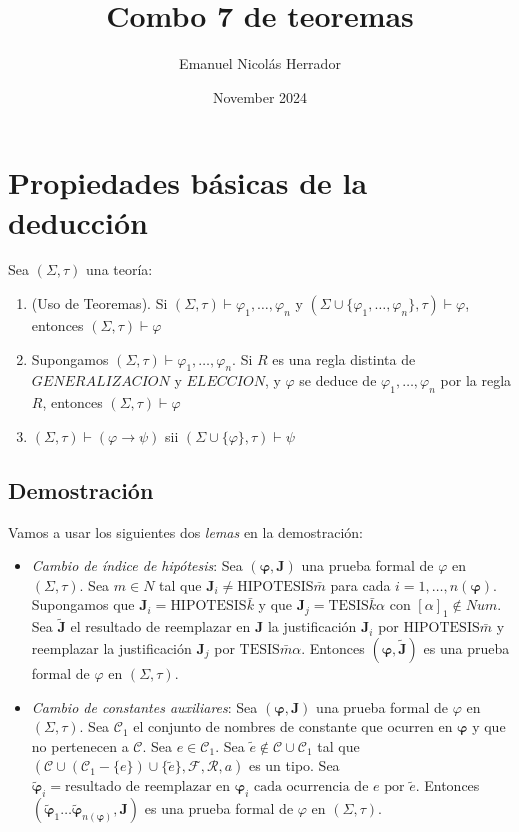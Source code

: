 \documentclass{article}
\title{Combo 7 de teoremas}
\author{Emanuel Nicolás Herrador}
\date{November 2024}
\begin{document}
\maketitle

\section*{Propiedades básicas de la deducción}
Sea $(\Sigma,\tau)$ una teoría:
\begin{enumerate}
  \item (Uso de Teoremas). Si $(\Sigma,\tau)\vdash\varphi_1,\dots,\varphi_n$ y $(\Sigma\cup\{\varphi_1,\dots,\varphi_n\},\tau)\vdash\varphi$, entonces $(\Sigma,\tau)\vdash\varphi$
  \item Supongamos $(\Sigma,\tau)\vdash\varphi_1,\dots,\varphi_n$. Si $R$ es una regla distinta de $GENERALIZACION$ y $ELECCION$, y $\varphi$ se deduce de $\varphi_1,\dots,\varphi_n$ por la regla $R$, entonces $(\Sigma,\tau)\vdash\varphi$
  \item $(\Sigma,\tau)\vdash(\varphi\to\psi)$ sii $(\Sigma\cup\{\varphi\},\tau)\vdash\psi$
\end{enumerate}
\subsection*{Demostración}
Vamos a usar los siguientes dos \textit{lemas} en la demostración:
\begin{itemize}
  \item \textit{Cambio de índice de hipótesis}: Sea $(\boldsymbol{\varphi},\mathbf{J})$ una prueba formal de $\varphi$ en $(\Sigma,\tau)$. Sea $m\in N$ tal que $\mathbf{J}_i\neq\text{HIPOTESIS}\bar{m}$ para cada $i=1,\dots,n(\boldsymbol{\varphi})$. Supongamos que $\mathbf{J}_i=\text{HIPOTESIS}\bar{k}$ y que $\mathbf{J}_j=\text{TESIS}\bar{k}\alpha$ con $[\alpha]_1\notin Num$. Sea $\tilde{\mathbf{J}}$ el resultado de reemplazar en $\mathbf{J}$ la justificación $\mathbf{J}_i$ por $\text{HIPOTESIS}\bar{m}$ y reemplazar la justificación $\mathbf{J}_j$ por $\text{TESIS}\bar{m}\alpha$. Entonces $(\boldsymbol{\varphi},\tilde{\mathbf{J}})$ es una prueba formal de $\varphi$ en $(\Sigma,\tau)$.
  \item \textit{Cambio de constantes auxiliares}: Sea $(\boldsymbol{\varphi},\mathbf{J})$ una prueba formal de $\varphi$ en $(\Sigma,\tau)$. Sea $\mathcal{C}_1$ el conjunto de nombres de constante que ocurren en $\boldsymbol{\varphi}$ y que no pertenecen a $\mathcal{C}$. Sea $e\in\mathcal{C}_1$. Sea $\tilde{e}\notin\mathcal{C}\cup\mathcal{C}_1$ tal que $(\mathcal{C}\cup(\mathcal{C}_1-\{e\})\cup\{\tilde{e}\},\mathcal{F},\mathcal{R},a)$ es un tipo. Sea $\tilde{\boldsymbol{\varphi}}_i=\text{resultado de reemplazar en }\boldsymbol{\varphi}_i\text{ cada ocurrencia de }e\text{ por }\tilde{e}$. Entonces $(\tilde{\boldsymbol{\varphi}}_1\dots\tilde{\boldsymbol{\varphi}}_{n(\boldsymbol{\varphi})},\mathbf{J})$ es una prueba formal de $\varphi$ en $(\Sigma,\tau)$.
\end{itemize}
\end{document}
